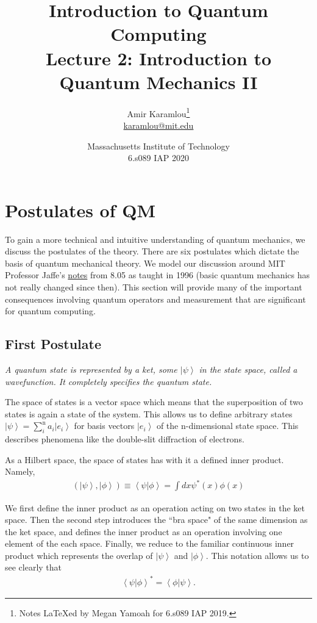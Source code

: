 \documentclass[11pt]{article} %
\author{Amir Karamlou\footnote{Notes LaTeXed by Megan Yamoah for 6.s089 IAP 2019.}\\\href{mailto:karamlou@mit.edu}{karamlou@mit.edu}}
\title{Introduction to Quantum Computing\\Lecture 2: Introduction to Quantum Mechanics II}
\date{Massachusetts Institute of Technology\\6.s089 IAP 2020}
\newcommand{\ket}[1]{\left|#1\right\rangle}
\newcommand{\braket}[2]{\left\langle#1 |  #2\right\rangle}
\begin{document}
\maketitle
\newpage
\tableofcontents
\newpage


\section{Postulates of QM} \label{pos}
To gain a more technical and intuitive understanding of quantum mechanics, we discuss the postulates of the theory. There are six postulates which dictate the basis of quantum mechanical theory. We model our discussion around MIT Professor Jaffe's \href{http://web.mit.edu/8.05/handouts/jaffe1.pdf}{notes} from 8.05 as taught in 1996 (basic quantum mechanics has not really changed since then). This section will provide many of the important consequences involving quantum operators and measurement that are significant for quantum computing.

\subsection{First Postulate}
\begin{center}
    \textit{A quantum state is represented by a ket, some $\ket{\psi}$ in the state space, called a wavefunction. It completely specifies the quantum state.}
\end{center}

The space of states is a vector space which means that the superposition of two states is again a state of the system. This allows us to define arbitrary states $\ket{\psi} = \sum^\textrm{n}_ia_i\ket{e_i}$ for basis vectors $\ket{e_i}$ of the n-dimensional state space. This describes phenomena like the double-slit diffraction of electrons.

As a Hilbert space, the space of states has with it a defined inner product. Namely,
\begin{align}
    \left(\ket{\psi},\ket{\phi}\right) \equiv \braket{\psi}{\phi} = \int dx\psi^\ast(x)\phi(x)
\end{align}

We first define the inner product as an operation acting on two states in the ket space. Then the second step introduces the ``bra space" of the same dimension as the ket space, and defines the inner product as an operation involving one element of the each space. Finally, we reduce to the familiar continuous inner product which represents the overlap of $\ket{\psi}$ and $\ket{\phi}$. This notation allows us to see clearly that
\begin{align}
    \braket{\psi}{\phi}^\ast = \braket{\phi}{\psi}.
\end{align}
\end{document}

